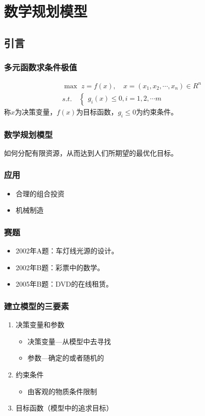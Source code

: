 \section{数学规划模型}
\subsection{引言}
\subsubsection{多元函数求条件极值}
\begin{align*}
&\max\,\,z=f(x),\quad x=(x_1,x_2,\cdots,x_n)\in R^n \\
&s.t.\quad
    \begin{cases}
        g_i(x)\leq 0,i=1,2,\cdots m
    \end{cases}
\end{align*}
称$x$为决策变量，$f(x)$为目标函数，$g_i\leq 0$为约束条件。
\subsubsection{数学规划模型}
如何分配有限资源，从而达到人们所期望的最优化目标。
\subsubsection{应用}
\begin{itemize}
\item 合理的组合投资
\item 机械制造
\end{itemize}
\subsubsection{赛题}
\begin{itemize}
\item 2002年A题：车灯线光源的设计。
\item 2002年B题：彩票中的数学。
\item 2005年B题：DVD的在线租赁。
\end{itemize}
\subsubsection{建立模型的三要素}
\begin{enumerate}[(1)]
\item 决策变量和参数
    \begin{itemize}
    \item 决策变量---从模型中去寻找
    \item 参数---确定的或者随机的
    \end{itemize}
\item 约束条件
    \begin{itemize}
    \item 由客观的物质条件限制
    \end{itemize}
\item 目标函数（模型中的追求目标）
\end{enumerate}
